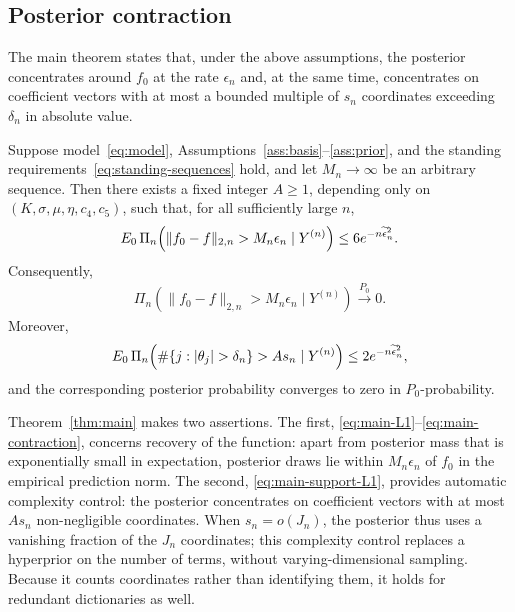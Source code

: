 \subsection{Posterior contraction}\label{sec:contraction}

The main theorem states that, under the above assumptions, the posterior concentrates around $f_0$ at the rate $\epsilon_n$ and, at the same time, concentrates on coefficient vectors with at most a bounded multiple of $s_n$ coordinates exceeding $\delta_n$ in absolute value.

\begin{theorem}\label{thm:main}
Suppose model~\eqref{eq:model}, Assumptions~\ref{ass:basis}--\ref{ass:prior}, and the standing requirements~\eqref{eq:standing-sequences} hold, and let $M_n\to\infty$ be an arbitrary sequence. Then there exists a fixed integer $A\geq1$, depending only on $(K,\sigma,\mu,\eta,c_4,c_5)$, such that, for all sufficiently large $n$,
\begin{align}
E_0\,\Pi_n\!\left(\|f_0-f\|_{2,n}>M_n\epsilon_n\mid Y^{(n)}\right)
\leq6e^{-n\widetilde{\epsilon}_n^2}. \label{eq:main-L1}
\end{align}
Consequently,
\begin{align}
\Pi_n\!\left(\|f_0-f\|_{2,n}>M_n\epsilon_n\mid Y^{(n)}\right)
\xrightarrow{P_0}0. \label{eq:main-contraction}
\end{align}
Moreover,
\begin{align}
E_0\,\Pi_n\!\left(\#\{j:|\theta_j|>\delta_n\}>As_n\mid Y^{(n)}\right)
\leq2e^{-n\en^2}, \label{eq:main-support-L1}
\end{align}
and the corresponding posterior probability converges to zero in $P_0$-probability.
\end{theorem}

Theorem~\ref{thm:main} makes two assertions. The first, \eqref{eq:main-L1}--\eqref{eq:main-contraction}, concerns recovery of the function: apart from posterior mass that is exponentially small in expectation, posterior draws lie within $M_n\epsilon_n$ of $f_0$ in the empirical prediction norm. The second, \eqref{eq:main-support-L1}, provides automatic complexity control: the posterior concentrates on coefficient vectors with at most $As_n$ non-negligible coordinates. When $s_n=o(J_n)$, the posterior thus uses a vanishing fraction of the $J_n$ coordinates; this complexity control replaces a hyperprior on the number of terms, without varying-dimensional sampling. Because it counts coordinates rather than identifying them, it holds for redundant dictionaries as well.

